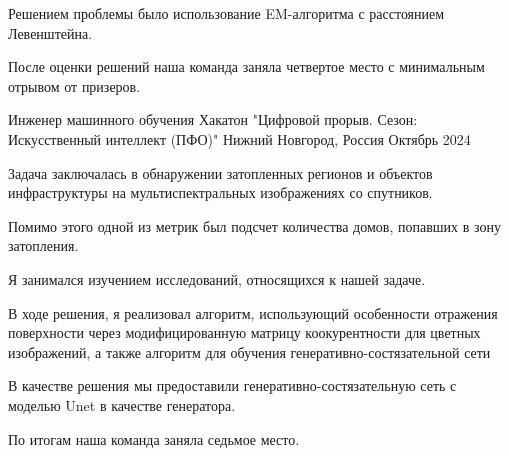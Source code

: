 \begin{cventries}
{\begin{cvitems}
    \item {Решением проблемы было использование EM-алгоритма с расстоянием Левенштейна.}
    \item {После оценки решений наша команда заняла четвертое место с минимальным отрывом от призеров. }
  \end{cvitems}
}
\cventry
{Инженер машинного обучения} %
{Хакатон "Цифровой прорыв. Сезон: Искусственный интеллект (ПФО)"} %
{Нижний Новгород, Россия} %
{Октябрь 2024} %
{
  \begin{cvitems} %
    \item {Задача заключалась в обнаружении затопленных регионов и объектов инфраструктуры на мультиспектральных изображениях со спутников. }
    \item {Помимо этого одной из метрик был подсчет количества домов, попавших в зону затопления. }
    \item {Я занимался изучением исследований, относящихся к нашей задаче. }
    \item {В ходе решения, я реализовал алгоритм, использующий особенности отражения поверхности через модифицированную матрицу коокурентности для цветных изображений, а также алгоритм для обучения генеративно-состязательной сети}
    \item {В качестве решения мы предоставили генеративно-состязательную сеть с моделью Unet в качестве генератора. } 
    \item {По итогам наша команда заняла седьмое место. }
  \end{cvitems}
}
\end{cventries}
